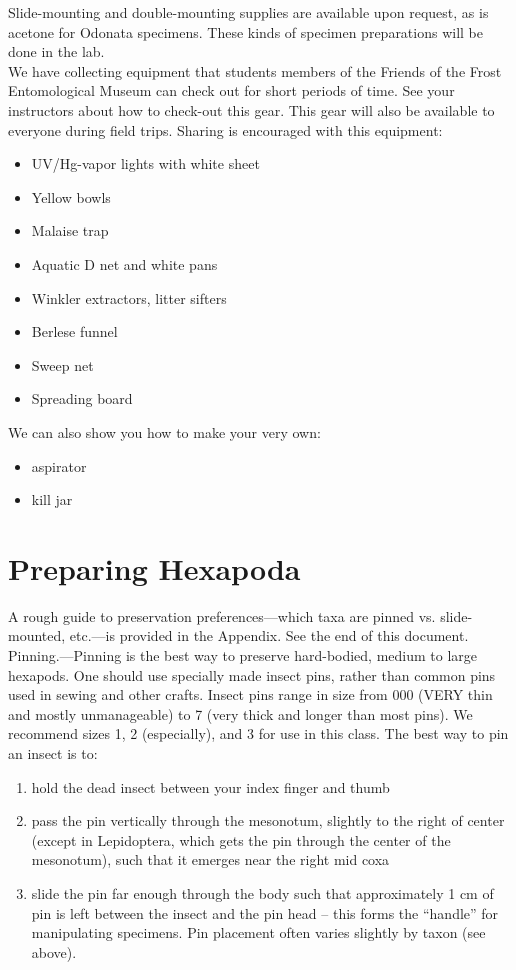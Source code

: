 \documentclass[letterpaper, 11pt]{article}
\begin{document}
Slide-mounting and double-mounting supplies are available upon request, as is acetone for Odonata specimens. These kinds of specimen preparations will be done in the lab.\\

We have collecting equipment that students members of the Friends of the Frost Entomological Museum can check out for short periods of time. See your instructors about how to check-out this gear. This gear will also be available to everyone during field trips. Sharing is encouraged with this equipment:

\begin{itemize}
\item UV/Hg-vapor lights with white sheet
\item Yellow bowls
\item Malaise trap
\item Aquatic D net and white pans
\item Winkler extractors, litter sifters
\item Berlese funnel
\item Sweep net
\item Spreading board
\end{itemize}

We can also show you how to make your very own:
 
\begin{itemize}
\item aspirator
\item kill jar
\end{itemize}


\section*{Preparing Hexapoda}
A rough guide to preservation preferences---which taxa are pinned vs. slide-mounted, etc.---is provided in the Appendix. See the end of this document.\\

Pinning.---Pinning is the best way to preserve hard-bodied, medium to large hexapods. One should use specially made insect pins, rather than common pins used in sewing and other crafts. Insect pins range in size from 000 (VERY thin and mostly unmanageable) to 7 (very thick and longer than most pins). We recommend sizes 1, 2 (especially), and 3 for use in this class. The best way to pin an insect is to:
 
\begin{enumerate}
\item hold the dead insect between your index finger and thumb
\item pass the pin vertically through the mesonotum, slightly to the right of center (except in Lepidoptera, which gets the pin through the center of the mesonotum), such that it emerges near the right mid coxa
\item slide the pin far enough through the body such that approximately 1 cm of pin is left between the insect and the pin head – this forms the “handle” for manipulating specimens. Pin placement often varies slightly by taxon (see above).
\end{enumerate}
\end{document}
